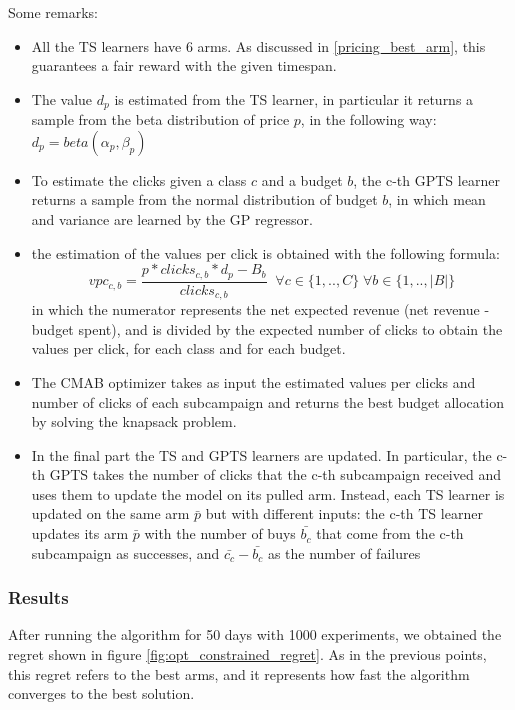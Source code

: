 Some remarks:
\begin{itemize}
    \item All the TS learners have 6 arms. As discussed in \ref{pricing_best_arm}, this guarantees a fair reward with the given timespan. 
    \item The value $d_p$ is estimated from the TS learner, in particular it returns a sample from the beta distribution of price $p$, in the following way: $d_p = beta(\alpha_p, \beta_p)$
    \item To estimate the clicks given a class $c$ and a budget $b$, the c-th GPTS learner returns a sample from the normal distribution of budget $b$, in which mean and variance are learned by the GP regressor.
    \item the estimation of the values per click is obtained with the following formula: 
    \[ vpc_{c,b} = \frac{p * clicks_{c,b} * d_p - B_b}{clicks_{c,b}} \;\; \forall c \in \{1,..,C\} \; \forall b \in \{1,..,|B|\} \]
    in which the numerator represents the net expected revenue (net revenue - budget spent), and is divided by the expected number of clicks to obtain the values per click, for each class and for each budget.
    \item The CMAB optimizer takes as input the estimated values per clicks and number of clicks of each subcampaign and returns the best budget allocation by solving the knapsack problem.
    \item In the final part the TS and GPTS learners are updated. In particular, the c-th GPTS takes the number of clicks that the c-th subcampaign received and uses them to update the model on its pulled arm.
    Instead, each TS learner is updated on the same arm $\bar{p}$ but with different inputs: the c-th TS learner updates its arm $\bar{p}$ with the number of buys $\bar{b_c}$ that come from the c-th subcampaign as successes, and $\bar{c_c} - \bar{b_c}$ as the number of failures
\end{itemize}

\subsubsection{Results}
After running the algorithm for 50 days with 1000 experiments, we obtained the regret shown in figure \ref{fig:opt_constrained_regret}.
As in the previous points, this regret refers to the best arms, and it represents how fast the algorithm converges to the best solution.

